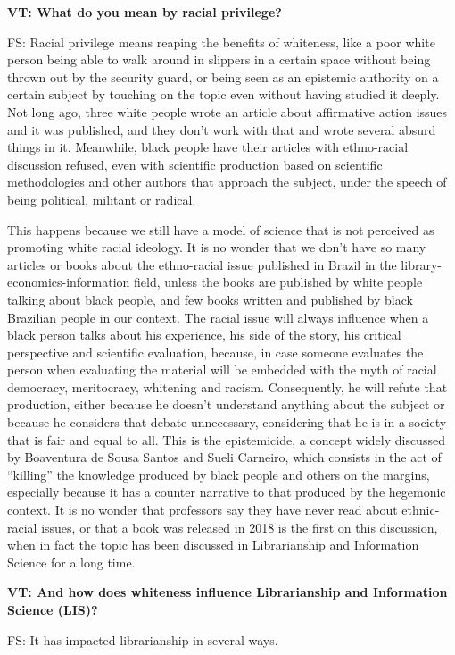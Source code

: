\documentclass[a4paper,
fontsize=11pt,
oneside,
numbers=noperiodatend,
parskip=half-,
bibliography=totoc,
final
]{scrartcl}
\begin{document}
\textbf{VT: What do you mean by racial privilege?}

FS: Racial privilege means reaping the benefits of whiteness, like a
poor white person being able to walk around in slippers in a certain
space without being thrown out by the security guard, or being seen as
an epistemic authority on a certain subject by touching on the topic
even without having studied it deeply. Not long ago, three white people
wrote an article about affirmative action issues and it was published,
and they don't work with that and wrote several absurd things in it.
Meanwhile, black people have their articles with ethno-racial discussion
refused, even with scientific production based on scientific
methodologies and other authors that approach the subject, under the
speech of being political, militant or radical.

This happens because we still have a model of science that is not
perceived as promoting white racial ideology. It is no wonder that we
don't have so many articles or books about the ethno-racial issue
published in Brazil in the library-economics-information field, unless
the books are published by white people talking about black people, and
few books written and published by black Brazilian people in our
context. The racial issue will always influence when a black person
talks about his experience, his side of the story, his critical
perspective and scientific evaluation, because, in case someone
evaluates the person when evaluating the material will be embedded with
the myth of racial democracy, meritocracy, whitening and racism.
Consequently, he will refute that production, either because he doesn't
understand anything about the subject or because he considers that
debate unnecessary, considering that he is in a society that is fair and
equal to all. This is the epistemicide, a concept widely discussed by
Boaventura de Sousa Santos and Sueli Carneiro, which consists in the act
of \enquote{killing} the knowledge produced by black people and others
on the margins, especially because it has a counter narrative to that
produced by the hegemonic context. It is no wonder that professors say
they have never read about ethnic-racial issues, or that a book was
released in 2018 is the first on this discussion, when in fact the topic
has been discussed in Librarianship and Information Science for a long
time.

\textbf{VT: And how does whiteness influence Librarianship and
Information Science (LIS)?}

FS: It has impacted librarianship in several ways.
\end{document}
